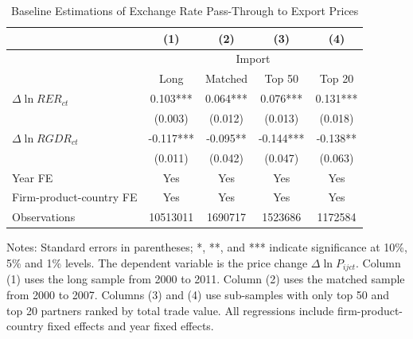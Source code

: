 \documentclass[12pt]{article}
\begin{document}
\setcounter{table}{0}

\renewcommand{\thetable}{A\arabic{table}}

\begin{table}[htbp]
	\centering
	\caption{Baseline Estimations of Exchange Rate Pass-Through to Export Prices}
	\begin{threeparttable}
		\begin{tabular}{lcccc}
			\toprule
			& (1)   & (2)   & (3)   & (4) \\
			\midrule
			& \multicolumn{4}{c}{Import} \\
			& Long & Matched & Top 50 & Top 20 \\
			\midrule
			$\Delta \ln RER_{ct}$ & 0.103*** & 0.064*** & 0.076*** & 0.131*** \\
			& (0.003) & (0.012) & (0.013) & (0.018) \\
			$\Delta \ln RGDR_{ct}$ &  -0.117*** & -0.095** & -0.144*** & -0.138** \\
			& (0.011) & (0.042) & (0.047) & (0.063) \\
			Year FE  & Yes   & Yes   & Yes   & Yes \\
			Firm-product-country FE & Yes   & Yes   & Yes   & Yes \\
			Observations & 10513011 & 1690717 & 1523686 & 1172584 \\
			\bottomrule
		\end{tabular}
		\begin{tablenotes}
			\footnotesize
			\item[Notes:] Standard errors in parentheses; *, **, and *** indicate significance at 10\%, 5\% and 1\% levels. The dependent variable is the price change $\Delta \ln P_{ijct}$. Column (1) uses the long sample from 2000 to 2011. Column (2) uses the matched sample from 2000 to 2007. Columns (3) and (4) use sub-samples with only top 50 and top 20 partners ranked by total trade value. All regressions include firm-product-country fixed effects and year fixed effects. 
		\end{tablenotes}
	\end{threeparttable}
	\label{tab.baseline.exp}
\end{table}
\end{document}
